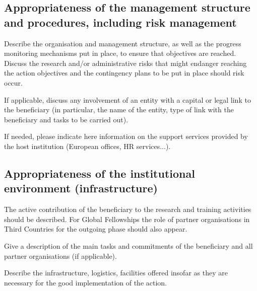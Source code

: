 \subsection{Appropriateness of the management structure and procedures, including risk management}
\label{sec:implementation_management}

Describe the organisation and management structure, as well as the progress
monitoring mechanisms put in place, to ensure that objectives are reached. Discuss the
research and/or administrative risks that might endanger reaching the action objectives
and the contingency plans to be put in place should risk occur.

\medskip\noindent
If applicable, discuss any involvement of an entity with a capital or legal link to the
beneficiary (in particular, the name of the entity, type of link with the beneficiary and
tasks to be carried out).

\medskip\noindent
If needed, please indicate here information on the support services provided by the
host institution (European offices, HR services...).


\subsection{Appropriateness of the institutional environment (infrastructure)}
\label{sec:implementation_infrastructure}

The active contribution of the beneficiary to the research and training activities should
be described. For Global Fellowships the role of partner organisations in Third
Countries for the outgoing phase should also appear.

\medskip\noindent
Give a description of the main tasks and commitments of the beneficiary and all
partner organisations (if applicable).

\medskip\noindent
Describe the infrastructure, logistics, facilities offered insofar as they are necessary for
the good implementation of the action.


\markEndPageLimit
